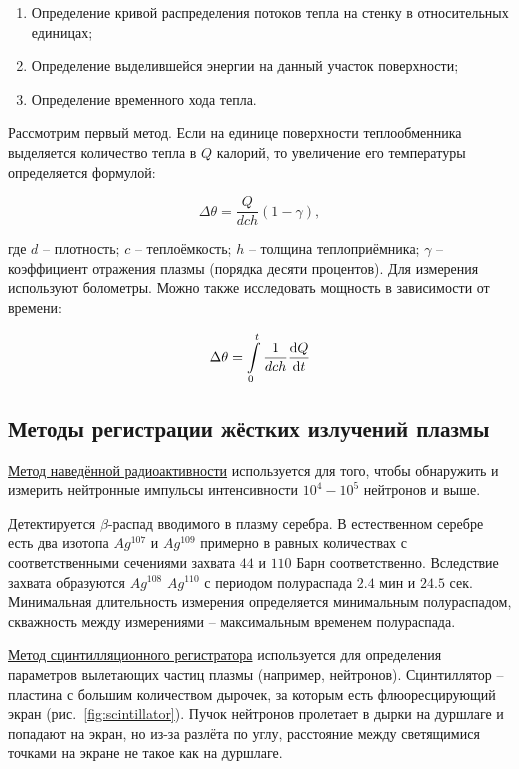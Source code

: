 \documentclass[10pt, a4paper]{article}
\begin{document}
\begin{enumerate}
	\item Определение кривой распределения потоков тепла на стенку в относительных единицах;
	\item Определение выделившейся энергии на данный участок поверхности;
	\item Определение временного хода тепла.
\end{enumerate}

Рассмотрим первый метод. Если на единице поверхности теплообменника выделяется количество тепла в $Q$ калорий, то увеличение его температуры определяется формулой:

\begin{equation*}
	\Delta \theta= \frac{Q}{dch}(1-\gamma),
\end{equation*}

где $d$ -- плотность; $c$ -- теплоёмкость; $h$ -- толщина теплоприёмника; $\gamma$ -- коэффициент отражения плазмы (порядка десяти процентов). Для измерения используют болометры. Можно также исследовать мощность в зависимости от времени:

\begin{equation*}
	\Delta \theta= \int\limits_0^t\frac{1}{dch}\dv{Q}{t}
\end{equation*}

\subsection{Методы регистрации жёстких излучений плазмы}

\uline{Метод наведённой радиоактивности} используется для того, чтобы обнаружить и измерить нейтронные импульсы интенсивности $10^4 - 10^5$ нейтронов и выше.

Детектируется $\beta$-распад вводимого в плазму серебра. В естественном серебре есть два изотопа $Ag^107$ и $Ag^109$ примерно в равных количествах с соответственными сечениями захвата $44$ и $110$ Барн соответственно. Вследствие захвата образуются $Ag^108$ $Ag^110$ с периодом полураспада $2.4$ мин и $24.5$ сек. Минимальная длительность измерения определяется минимальным полураспадом, скважность между измерениями -- максимальным временем полураспада.

\uline{Метод сцинтилляционного регистратора} используется для определения параметров вылетающих частиц плазмы (например, нейтронов). Сцинтиллятор -- пластина с большим количеством дырочек, за которым есть флюоресцирующий экран (рис.~\ref{fig:scintillator}). Пучок нейтронов пролетает в дырки на дуршлаге и попадают на экран, но из-за разлёта по углу, расстояние между светящимися точками на экране не такое как на дуршлаге.
\end{document}
